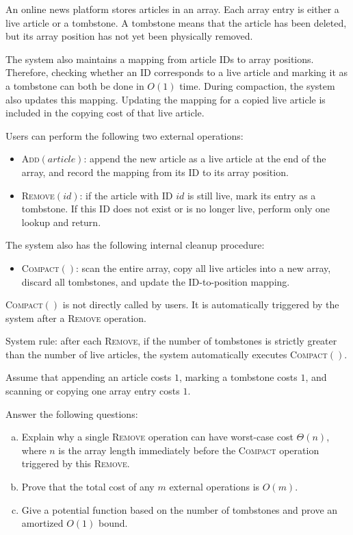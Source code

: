 
An online news platform stores articles in an array. Each array entry is either a live article or a tombstone. A tombstone means that the article has been deleted, but its array position has not yet been physically removed.

The system also maintains a mapping from article IDs to array positions. Therefore, checking whether an ID corresponds to a live article and marking it as a tombstone can both be done in \(O(1)\) time. During compaction, the system also updates this mapping. Updating the mapping for a copied live article is included in the copying cost of that live article.

Users can perform the following two external operations:
\begin{itemize}
    \item \textsc{Add}\((\textit{article})\): append the new article as a live article at the end of the array, and record the mapping from its ID to its array position.
    \item \textsc{Remove}\((\textit{id})\): if the article with ID \(\textit{id}\) is still live, mark its entry as a tombstone. If this ID does not exist or is no longer live, perform only one lookup and return.
\end{itemize}

The system also has the following internal cleanup procedure:
\begin{itemize}
    \item \textsc{Compact}\(()\): scan the entire array, copy all live articles into a new array, discard all tombstones, and update the ID-to-position mapping.
\end{itemize}
\textsc{Compact}\(()\) is not directly called by users. It is automatically triggered by the system after a \textsc{Remove} operation.

System rule: after each \textsc{Remove}, if the number of tombstones is strictly greater than the number of live articles, the system automatically executes \textsc{Compact}\(()\).

Assume that appending an article costs \(1\), marking a tombstone costs \(1\), and scanning or copying one array entry costs \(1\).

Answer the following questions:
\begin{enumerate}[(a)]
    \item Explain why a single \textsc{Remove} operation can have worst-case cost \(\Theta(n)\), where \(n\) is the array length immediately before the \textsc{Compact} operation triggered by this \textsc{Remove}.
    \item Prove that the total cost of any \(m\) external operations is \(O(m)\).
    \item Give a potential function based on the number of tombstones and prove an amortized \(O(1)\) bound.
\end{enumerate}

